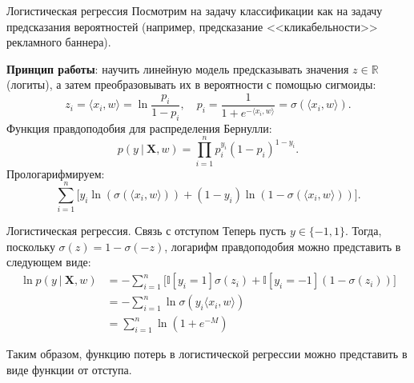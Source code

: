 \documentclass[notheorems, handout]{beamer}
\begin{document}
\begin{frame}{Логистическая регрессия}
	Посмотрим на задачу классификации как на задачу предсказания вероятностей (например, предсказание <<кликабельности>> рекламного баннера).

	\textbf{Принцип работы}: научить линейную модель предсказывать значения $z\in\mathbb{R}$ (логиты), а затем преобразовывать их в вероятности с помощью сигмоиды:
	\[
		z_i=\langle x_i, w\rangle = \ln\frac{p_i}{1 - p_i},\quad p_i = \frac{1}{1+e^{-\langle x_i, w\rangle}}=\sigma(\langle x_i, w\rangle).
	\]
	Функция правдоподобия для распределения Бернулли:
	\[
		p(y~|~\mathbf{X}, w)=\prod_{i=1}^np_i^{y_i}(1-p_i)^{1-y_i}.
	\]
	Прологарифмируем:
	\[
		\sum_{i=1}^n\Big[y_i\ln(\sigma(\langle x_i, w\rangle)) + (1-y_i)\ln(1-\sigma(\langle x_i, w\rangle))\Big].
	\]
\end{frame}

\begin{frame}{Логистическая регрессия. Связь с отступом}
	Теперь пусть $y\in\{-1, 1\}$. Тогда, поскольку $\sigma(z)=1-\sigma(-z)$, логарифм правдоподобия можно представить в следующем виде:
	\begin{align*}
		\ln p (y~|~ \mathbf{X}, w) & = -\sum_{i=1}^n\Big[\mathbb{I}[y_i=1]\sigma(z_i)+\mathbb{I}[y_i=-1]\left(1-\sigma(z_i)\right)\Big] \\
		                           & = -\sum_{i=1}^n \ln\sigma(y_i\langle x_i, w\rangle)                                                \\
		                           & = \sum_{i=1}^n \ln\left(1 + e^{-M}\right)
	\end{align*}

	Таким образом, функцию потерь в логистической регрессии можно представить в виде функции от отступа.
\end{frame}
\end{document}
